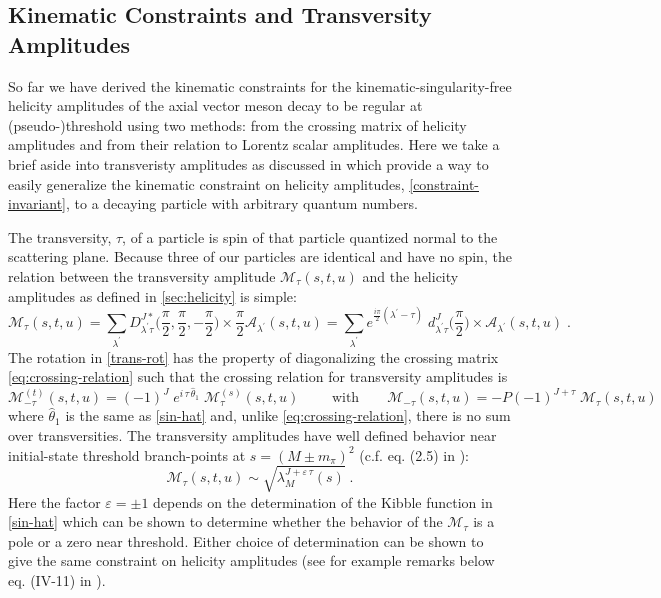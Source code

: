 \documentclass[10pt, aps,prd,amsmath,amssymb,superscriptaddress,onecolumn,
nofootinbib,showpacs,preprintnumbers]{revtex4-1}
\newcommand{\lamp}{{\lambda^\prime}}
\begin{document}
\subsection{Kinematic Constraints and Transversity Amplitudes} \label{sec:transetivity}
So far we have derived the kinematic constraints for the kinematic-singularity-free helicity amplitudes of the axial vector meson decay to be regular at (pseudo-)threshold using two methods: from the crossing matrix of helicity amplitudes and from their relation to Lorentz scalar amplitudes. Here we take a brief aside into transveristy amplitudes as discussed in \cite{Kotanski1968,Cohen-Tannoudji1968,McKerrell1968} which provide a way to easily generalize the kinematic constraint on helicity amplitudes, \cref{constraint-invariant}, to a decaying particle with arbitrary quantum numbers.

The transversity, \(\tau\), of a particle is spin of that particle quantized normal to the scattering plane. Because three of our particles are identical and have no spin, the relation between the transversity amplitude \(\mathcal{M}_\tau(s,t,u)\) and the helicity amplitudes as defined in \cref{sec:helicity} is simple:
  \begin{equation} \label{trans-rot}
    \mathcal{M}_\tau (s,t,u) = \sum_{\lambda^\prime} D_{\lamp \tau}^{J*}\bigg(\frac{\pi}{2}, \frac{\pi}{2}, - \frac{\pi}{2} \bigg ) \times \frac{\pi}{2}\mathcal{A}_\lamp(s,t,u)
    = \sum_{\lamp} e^{\frac{i\pi}{2} (\lamp - \tau)} \; d^J_{\lamp \tau}\bigg(\frac{\pi}{2}\bigg) \times \mathcal{A}_\lamp(s,t,u) \; .
  \end{equation}
The rotation in \cref{trans-rot} has the property of diagonalizing the crossing matrix \cref{eq:crossing-relation} such that the crossing relation for transversity amplitudes is
  \begin{equation}
    \mathcal{M}^{(t)}_{-\tau}(s,t,u) = (-1)^J \; e^{i \, \tau \, \hat{\theta}_1} \; \mathcal{M}^{(s)}_\tau(s,t,u)
    \qquad \text{ with} \qquad
    \mathcal{M}_{-\tau}(s,t,u) = - P(-1)^{J+\tau} \; \mathcal{M}_\tau(s,t,u)
  \end{equation}
where \(\hat{\theta}_1\) is the same as \cref{sin-hat} and, unlike \cref{eq:crossing-relation}, there is no sum over transversities.
The transversity amplitudes have well defined behavior near initial-state threshold branch-points at \(s= (M\pm m_\pi)^2\) (c.f. eq. (2.5) in \cite{Kotanski1968}):
  \begin{equation} \label{trans-constraint}
    \mathcal{M}_\tau(s,t,u) \sim \sqrt{\lambda_M^{J + \varepsilon \, \tau}(s)}\; .
  \end{equation}
Here the factor \(\varepsilon = \pm 1\) depends on the determination of the Kibble function in \cref{sin-hat} which can be shown to determine whether the behavior of the \(\mathcal{M}_\tau\) is a pole or a zero near threshold. Either choice of determination can be shown to give the same constraint on helicity amplitudes (see for example remarks below eq. (IV-11) in \cite{Cohen-Tannoudji1968}).
\end{document}
